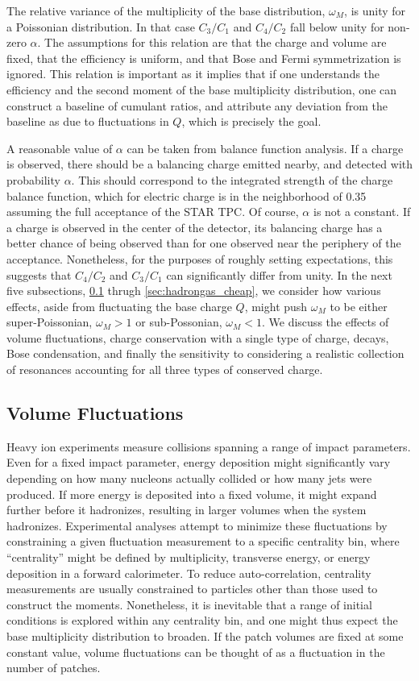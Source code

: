 The relative variance of the multiplicity of the base distribution, $\omega_M$, is unity for a Poissonian distribution. In that case $C_3/C_1$ and $C_4/C_2$ fall below unity for non-zero $\alpha$. The assumptions for this relation are that the charge and volume are fixed, that the efficiency is uniform, and that Bose and Fermi symmetrization is ignored. This relation is important as it implies that if one understands the efficiency and the second moment of the base multiplicity distribution, one can construct a baseline of cumulant ratios, and attribute any deviation from the baseline as due to fluctuations in $Q$, which is precisely the goal.

A reasonable value of $\alpha$ can be taken from balance function analysis. If a charge is observed, there should be a balancing charge emitted nearby, and detected with probability $\alpha$. This should correspond to the integrated strength of the charge balance function, which for electric charge is in the neighborhood of 0.35 assuming the full acceptance of the STAR TPC. Of course, $\alpha$ is not a constant. If a charge is observed in the center of the detector, its balancing charge has a better chance of being observed than for one observed near the periphery of the acceptance. Nonetheless, for the purposes of roughly setting expectations, this suggests that $C_4/C_2$ and $C_3/C_1$ can significantly differ from unity. In the next five subsections, \ref{sec:volumefluc} thrugh \ref{sec:hadrongas_cheap}, we consider how various effects, aside from fluctuating the base charge $Q$, might push $\omega_M$ to be either super-Poissonian, $\omega_M>1$ or sub-Possonian, $\omega_M<1$. We discuss the effects of volume fluctuations, charge conservation with a single type of charge, decays, Bose condensation, and finally the sensitivity to considering a realistic collection of resonances accounting for all three types of conserved charge.

\subsection{Volume Fluctuations}\label{sec:volumefluc}

Heavy ion experiments measure collisions spanning a range of impact parameters. Even for a fixed impact parameter, energy deposition might significantly vary depending on how many nucleons actually collided or how many jets were produced. If more energy is deposited into a fixed volume, it might expand further before it hadronizes, resulting in larger volumes when the system hadronizes. Experimental analyses attempt to minimize these fluctuations by constraining a given fluctuation measurement to a specific centrality bin, where ``centrality'' might be defined by multiplicity, transverse energy, or energy deposition in a forward calorimeter. To reduce auto-correlation, centrality measurements are usually constrained to particles other than those used to construct the moments. Nonetheless, it is inevitable that a range of initial conditions is explored within any centrality bin, and one might thus expect the base multiplicity distribution to broaden. If the patch volumes are fixed at some constant value, volume fluctuations can be thought of as a fluctuation in the number of patches. 

